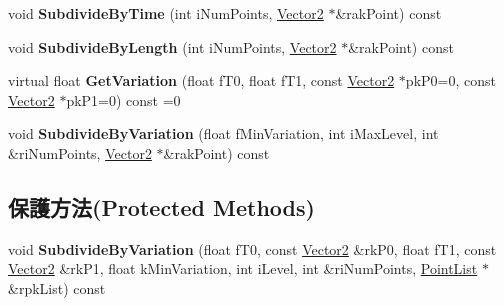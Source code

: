 \begin{DoxyCompactItemize}
\item 
void {\bfseries Subdivide\+By\+Time} (int i\+Num\+Points, \hyperlink{class_i_dream_sky_1_1_vector2}{Vector2} $\ast$\&rak\+Point) const \hypertarget{class_i_dream_sky_1_1_curve2_a95a3e0574ae5e75ee1dc82c867f77156}{}\label{class_i_dream_sky_1_1_curve2_a95a3e0574ae5e75ee1dc82c867f77156}

\item 
void {\bfseries Subdivide\+By\+Length} (int i\+Num\+Points, \hyperlink{class_i_dream_sky_1_1_vector2}{Vector2} $\ast$\&rak\+Point) const \hypertarget{class_i_dream_sky_1_1_curve2_aab2b59146e5dc02d949ff9b2c5b870a1}{}\label{class_i_dream_sky_1_1_curve2_aab2b59146e5dc02d949ff9b2c5b870a1}

\item 
virtual float {\bfseries Get\+Variation} (float f\+T0, float f\+T1, const \hyperlink{class_i_dream_sky_1_1_vector2}{Vector2} $\ast$pk\+P0=0, const \hyperlink{class_i_dream_sky_1_1_vector2}{Vector2} $\ast$pk\+P1=0) const  =0\hypertarget{class_i_dream_sky_1_1_curve2_aa559c7c912c0babdb9db5af94d1cbad6}{}\label{class_i_dream_sky_1_1_curve2_aa559c7c912c0babdb9db5af94d1cbad6}

\item 
void {\bfseries Subdivide\+By\+Variation} (float f\+Min\+Variation, int i\+Max\+Level, int \&ri\+Num\+Points, \hyperlink{class_i_dream_sky_1_1_vector2}{Vector2} $\ast$\&rak\+Point) const \hypertarget{class_i_dream_sky_1_1_curve2_a454cd1ffa4154d7b6116da76221b767d}{}\label{class_i_dream_sky_1_1_curve2_a454cd1ffa4154d7b6116da76221b767d}

\end{DoxyCompactItemize}
\subsection*{保護方法(Protected Methods)}
\begin{DoxyCompactItemize}
\item 
void {\bfseries Subdivide\+By\+Variation} (float f\+T0, const \hyperlink{class_i_dream_sky_1_1_vector2}{Vector2} \&rk\+P0, float f\+T1, const \hyperlink{class_i_dream_sky_1_1_vector2}{Vector2} \&rk\+P1, float k\+Min\+Variation, int i\+Level, int \&ri\+Num\+Points, \hyperlink{class_i_dream_sky_1_1_curve2_1_1_point_list}{Point\+List} $\ast$\&rpk\+List) const \hypertarget{class_i_dream_sky_1_1_curve2_afdf482d13c43764eef467d9bfc9deb00}{}\label{class_i_dream_sky_1_1_curve2_afdf482d13c43764eef467d9bfc9deb00}

\end{DoxyCompactItemize}

